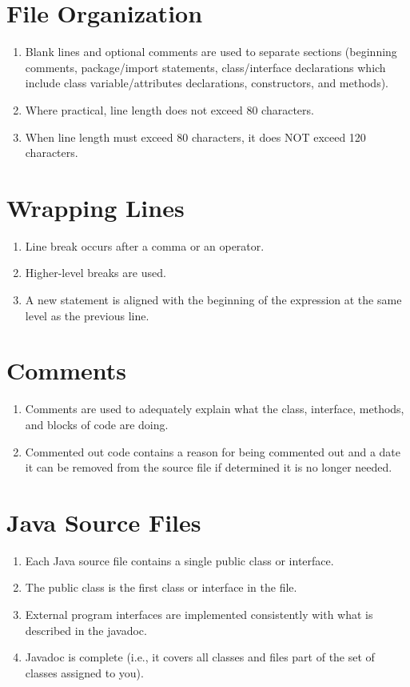 \documentclass{scrreprt}
\begin{document}
\begin{appendix}
\section*{File Organization}\begin{enumerate}[resume]
\item Blank lines and optional comments are used to separate sections (beginning comments, package/import statements, class/interface declarations which include class variable/attributes declarations, constructors, and methods).
\item Where practical, line length does not exceed 80 characters.
\item When line length must exceed 80 characters, it does NOT exceed 120 characters.
\end{enumerate}

\section*{Wrapping Lines}\begin{enumerate}[resume]
\item Line break occurs after a comma or an operator.
\item Higher-level breaks are used.
\item A new statement is aligned with the beginning of the expression at the same level as the previous line.
\end{enumerate}

\section*{Comments}\begin{enumerate}[resume]
\item Comments are used to adequately explain what the class, interface, methods, and blocks of code are doing.
\item Commented out code contains a reason for being commented out and a date it can be removed from the source file if determined it is no longer needed.
\end{enumerate}

\section*{Java Source Files}\begin{enumerate}[resume]
\item Each Java source file contains a single public class or interface.
\item The public class is the first class or interface in the file.
\item External program interfaces are implemented consistently with what is described in the javadoc.
\item Javadoc is complete (i.e., it covers all classes and files part of the set of classes assigned to you).
\end{enumerate}


\end{appendix}
\end{document}
